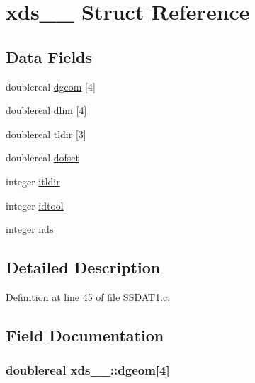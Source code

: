 \hypertarget{structxds__1__}{}\section{xds\+\_\+\_\+ Struct Reference}
\label{structxds__1__}
\subsection*{Data Fields}
\begin{DoxyCompactItemize}
\item 
doublereal \hyperlink{structxds__1___aa6d0c18d2f57a2887e6803c4071ce4b6}{dgeom} \mbox{[}4\mbox{]}
\item 
doublereal \hyperlink{structxds__1___ab1e455b4519b80b68b4ee3cb1a66737e}{dlim} \mbox{[}4\mbox{]}
\item 
doublereal \hyperlink{structxds__1___aa53640f173caddfcf7fb683cae6a6b03}{tldir} \mbox{[}3\mbox{]}
\item 
doublereal \hyperlink{structxds__1___a8bae1632a1ed8e3cc0b0894c9abf5c0a}{dofset}
\item 
integer \hyperlink{structxds__1___a3b6b60305ab915c9b00fad7da4b15a81}{itldir}
\item 
integer \hyperlink{structxds__1___a2ad5e433cfd6f2dbd17bc06a709a5cd6}{idtool}
\item 
integer \hyperlink{structxds__1___aee71452b69897fed2585126ac7b9c405}{nds}
\end{DoxyCompactItemize}


\subsection{Detailed Description}


Definition at line 45 of file S\+S\+D\+A\+T1.\+c.



\subsection{Field Documentation}
\subsubsection[{\texorpdfstring{dgeom}{dgeom}}]{\setlength{\rightskip}{0pt plus 5cm}doublereal xds\+\_\+\_\+\+::dgeom\mbox{[}4\mbox{]}}\hypertarget{structxds__1___aa6d0c18d2f57a2887e6803c4071ce4b6}{}\label{structxds__1___aa6d0c18d2f57a2887e6803c4071ce4b6}


